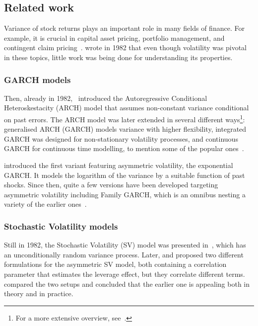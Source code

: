 \subsection{Related work}

Variance of stock returns plays an important role in many fields of finance.
For example, it is crucial in capital asset pricing, portfolio management, and contingent claim pricing~\citep{hull1987pricing,skiadas2009asset,chow2014study}.
\citet{Christie1982} wrote in 1982 that even though volatility was pivotal in these topics, little work was being done for understanding its properties.

\subsubsection*{GARCH models}

Then, already in 1982,~\citet{Engle1982} introduced the Autoregressive Conditional Heteroskestacity (ARCH) model that assumes non-constant variance conditional on past errors.
The ARCH model was later extended in several different ways\footnote{For a more extensive overview, see~\citet{bollerslev1994arch}.}: generalised ARCH (GARCH) models variance with higher flexibility, integrated GARCH was designed for non-stationary volatility processes, and continuous GARCH for continuous time modelling, to mention some of the popular ones~\citep{Bollerslev1986,engle1986modelling,box1994time,kluppelberg2004continuous}.

\citet{Nelson1991} introduced the first variant featuring asymmetric volatility, the exponential GARCH.
It models the logarithm of the variance by a suitable function of past shocks.
Since then, quite a few versions have been developed targeting asymmetric volatility including Family GARCH, which is an omnibus nesting a variety of the earlier ones~\citep{engle1993measuring,glosten1993relation,zakoian1994threshold,sentana1995quadratic,hentschel1995all}.

\subsubsection*{Stochastic Volatility models}

Still in 1982, the Stochastic Volatility (SV) model was presented in~\citet{Taylor1982}, which has an unconditionally random variance process.
Later, \citet{Harvey1996} and \citet{Jacquier2004} proposed two different formulations for the asymmetric SV model, both containing a correlation parameter that estimates the leverage effect, but they correlate different terms.
~\citet{yu2005leverage} compared the two setups and concluded that the earlier one is appealing both in theory and in practice.

